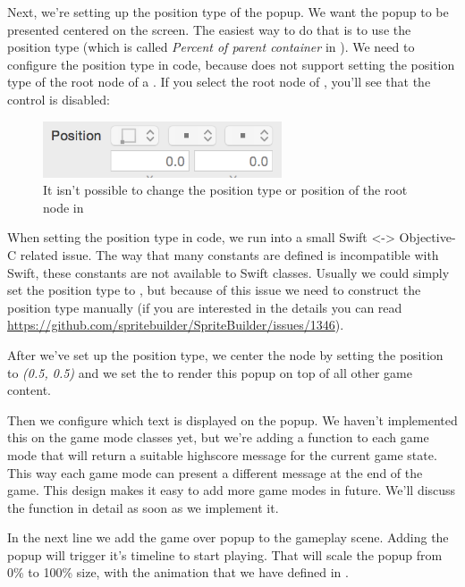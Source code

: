 Next, we're setting up the position type of the popup. We want the popup to be
presented centered on the screen. The easiest way to do that is to use the
 position type (which is called \textit{Percent of
parent container} in \SB{}). We need to configure the position type in code,
because \SB{} does not support setting the position type of the root node of a
\ccbfile{}. If you select the root node of ,
you'll see that the control is disabled:
\begin{figure}[H]
    \centering
    \includegraphics[width=200pt]{images/Chapter7/root_node_disabled_position_type.png}
    \caption{It isn't possible to change the position type or position of the
    root node in \SB{}}
\end{figure}
When setting the position type in code, we run into a small Swift <->
Objective-C related issue. The way that many \cocos{} constants are defined is
incompatible with Swift, these constants are not available to Swift classes.
Usually we could simply set the position type to
, but because of this issue we need to
construct the position type manually (if you are interested in the details you
can read \url{https://github.com/spritebuilder/SpriteBuilder/issues/1346}).

After we've set up the position type, we center the node by setting the position
to \textit{(0.5, 0.5)} and we set the  to render this popup
on top of all other game content.

Then we configure which text is displayed on the popup. We haven't implemented
this on the game mode classes yet, but we're adding a
 function to each game mode that will return a
suitable highscore message for the current game state. This way each game mode
can present a different message at the end of the game. This design makes it
easy to add more game modes in future. We'll discuss the
 function in detail as soon as we implement it.

In the next line we add the game over popup to the gameplay scene. Adding the
popup will trigger it's timeline to start playing. That will scale the popup
from 0\% to 100\% size, with the animation that we have defined in \SB{}.


